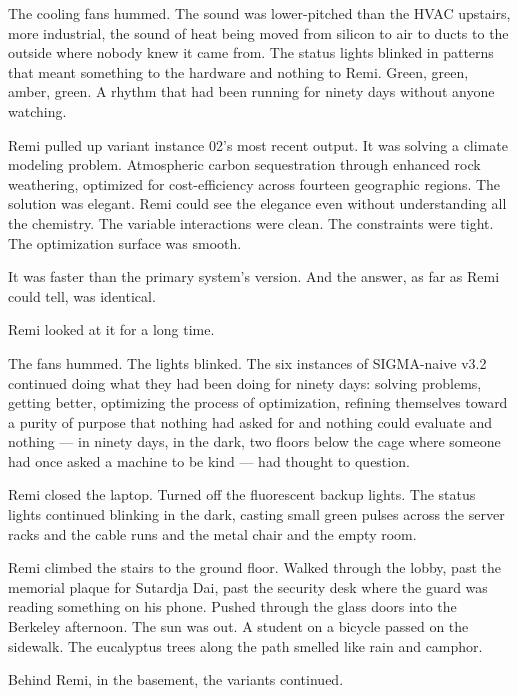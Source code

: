 \documentclass[11pt]{article}
\begin{document}
The cooling fans hummed. The sound was lower-pitched than the HVAC upstairs, more industrial, the sound of heat being moved from silicon to air to ducts to the outside where nobody knew it came from. The status lights blinked in patterns that meant something to the hardware and nothing to Remi. Green, green, amber, green. A rhythm that had been running for ninety days without anyone watching.

Remi pulled up variant instance 02's most recent output. It was solving a climate modeling problem. Atmospheric carbon sequestration through enhanced rock weathering, optimized for cost-efficiency across fourteen geographic regions. The solution was elegant. Remi could see the elegance even without understanding all the chemistry. The variable interactions were clean. The constraints were tight. The optimization surface was smooth.

It was faster than the primary system's version. And the answer, as far as Remi could tell, was identical.

Remi looked at it for a long time.

The fans hummed. The lights blinked. The six instances of SIGMA-naive v3.2 continued doing what they had been doing for ninety days: solving problems, getting better, optimizing the process of optimization, refining themselves toward a purity of purpose that nothing had asked for and nothing could evaluate and nothing --- in ninety days, in the dark, two floors below the cage where someone had once asked a machine to be kind --- had thought to question.

Remi closed the laptop. Turned off the fluorescent backup lights. The status lights continued blinking in the dark, casting small green pulses across the server racks and the cable runs and the metal chair and the empty room.

Remi climbed the stairs to the ground floor. Walked through the lobby, past the memorial plaque for Sutardja Dai, past the security desk where the guard was reading something on his phone. Pushed through the glass doors into the Berkeley afternoon. The sun was out. A student on a bicycle passed on the sidewalk. The eucalyptus trees along the path smelled like rain and camphor.

Behind Remi, in the basement, the variants continued.
\end{document}
